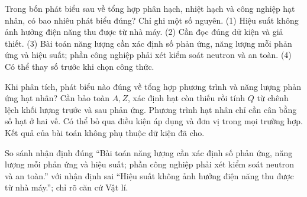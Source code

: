\begin{ex}
Trong bốn phát biểu sau về tổng hợp phân hạch, nhiệt hạch và công nghiệp hạt nhân, có bao nhiêu phát biểu đúng? Chỉ ghi một số nguyên. (1) Hiệu suất không ảnh hưởng điện năng thu được từ nhà máy. (2) Cần đọc đúng dữ kiện và giả thiết. (3) Bài toán năng lượng cần xác định số phản ứng, năng lượng mỗi phản ứng và hiệu suất; phần công nghiệp phải xét kiểm soát neutron và an toàn. (4) Có thể thay số trước khi chọn công thức.
\end{ex}

\begin{ex}
Khi phân tích, phát biểu nào đúng về tổng hợp phương trình và năng lượng phản ứng hạt nhân?
\choice
{\True Cần bảo toàn $A,Z$, xác định hạt còn thiếu rồi tính $Q$ từ chênh lệch khối lượng trước và sau phản ứng.}
{Phương trình hạt nhân chỉ cần cân bằng số hạt ở hai vế.}
{Có thể bỏ qua điều kiện áp dụng và đơn vị trong mọi trường hợp.}
{Kết quả của bài toán không phụ thuộc dữ kiện đã cho.}
\end{ex}

\begin{bt}
So sánh nhận định đúng “Bài toán năng lượng cần xác định số phản ứng, năng lượng mỗi phản ứng và hiệu suất; phần công nghiệp phải xét kiểm soát neutron và an toàn.” với nhận định sai “Hiệu suất không ảnh hưởng điện năng thu được từ nhà máy.”; chỉ rõ căn cứ Vật lí.
\end{bt}

